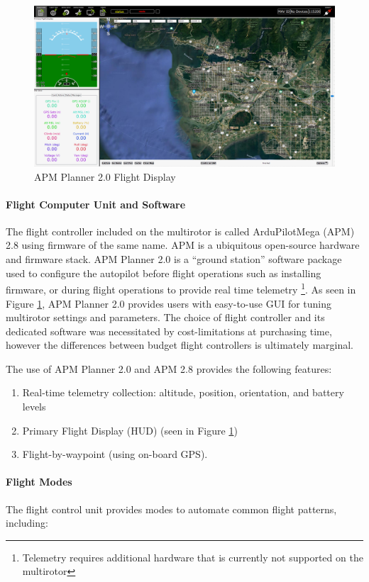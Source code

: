 \begin{figure}[H]
	\centering
	\includegraphics[width=15cm]{img/HUD.png}
	\caption{APM Planner 2.0 Flight Display}
	\label{flightdisplay}
\end{figure}

\paragraph{Flight Computer Unit and Software}
The flight controller included on the multirotor is called ArduPilotMega (APM) 2.8 using firmware of the same name. APM is a ubiquitous open-source hardware and firmware stack. APM Planner 2.0 is a ``ground station'' software package used to configure the autopilot before flight operations such as installing firmware, or during flight operations to provide real time telemetry \footnote{Telemetry requires additional hardware that is currently not supported on the multirotor}. As seen in Figure \ref{flightdisplay}, APM Planner 2.0 provides users with easy-to-use GUI for tuning multirotor settings and parameters. The choice of flight controller and its dedicated software was necessitated by cost-limitations at purchasing time, however the differences between budget flight controllers is ultimately marginal.

The use of APM Planner 2.0 and APM 2.8 provides the following features:
\begin{enumerate}
	\item Real-time telemetry collection: altitude, position, orientation, and battery levels
	\item Primary Flight Display (HUD) (seen in Figure \ref{flightdisplay})
	\item Flight-by-waypoint (using on-board GPS).
\end{enumerate}

\paragraph{Flight Modes}
The flight control unit provides modes to automate common flight patterns, including:

